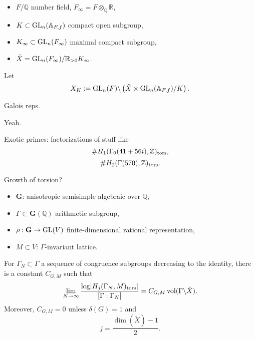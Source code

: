 \documentclass[reqno]{amsart} 
\begin{document}
\begin{itemize}
\item $F / \mathbb{Q}$ number field, $F _\infty = F \otimes_{\mathbb{Q}} \mathbb{R}$,
\item $K \subset \operatorname{GL}_n (\mathbb{A}_{F, f})$ compact open subgroup,
\item $K _\infty \subset \operatorname{GL}_n (F _\infty )$ maximal compact subgroup,
\item $\tilde{X} = \operatorname{GL}_n (F _\infty ) / \mathbb{R}_{> 0} K _\infty $.
\end{itemize}
Let
\begin{equation*}
X_K := \operatorname{GL}_n (F) \backslash \left( \tilde{X} \times \operatorname{GL}_n (\mathbb{A}_{F, f}) / K \right).
\end{equation*}
\begin{conjecture}\label{conjecture:cj45oak248}
  Galois reps.
\end{conjecture}
\begin{theorem}[Scholze]
  Yeah.
\end{theorem}

Exotic primes: factorizations of stuff like
\begin{equation*}
\# H_1 (\Gamma_0 (41 + 56 i), \mathbb{Z})_{\operatorname{tors}},
\end{equation*}
\begin{equation*}
\# H_2 (\Gamma (570), \mathbb{Z})_{\operatorname{tors}}.
\end{equation*}

Growth of torsion?
\begin{itemize}
\item $\mathbf{G}$: anisotropic semisimple algebraic over $\mathbb{Q}$,
\item $\Gamma \subset \mathbf{G} (\mathbb{Q})$ arithmetic subgroup,
\item $\rho : \mathbf{G} \rightarrow \operatorname{GL}(V)$ finite-dimensional rational representation,
\item $M \subset V$: $\Gamma$-invariant lattice.
\end{itemize}

\begin{conjecture}\label{conjecture:cj45oajukk}
  For $\Gamma_N \subset \Gamma$ a sequence of congruence subgroups decreasing to the identity, there is a constant $C_{G, M}$ such that
  \begin{equation*}
    \lim_{N \rightarrow \infty }
    \frac{\log \lvert H_j (\Gamma_N, M)_{\operatorname{tors}} \rvert}{
      [\Gamma : \Gamma_N ]
    }
    = C_{G, M} \operatorname{vol} (\Gamma \backslash \tilde{X}).
  \end{equation*}
  Moreover, $C_{G, M} = 0$ unless $\delta (G) = 1$ and
  \begin{equation*}
    j = \frac{\dim (\tilde{X})  - 1}{2}.
  \end{equation*}
\end{conjecture}
\end{document}
